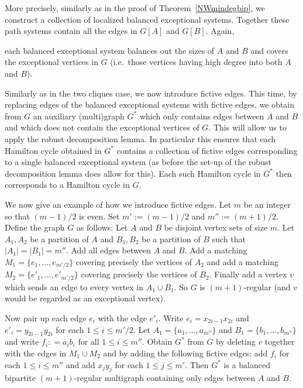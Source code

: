 \documentclass{memo-l}
\def\COMMENT#1{}
\numberwithin{section}{chapter}
\numberwithin{equation}{section}
\numberwithin{firstthm}{section}
\numberwithin{figure}{section}
\begin{document}
{More precisely, similarly as in the proof of Theorem~\ref{NWmindegbip}, we construct a collection of localized balanced exceptional systems.
Together these path systems contain all the edges in $G[A]$ and $G[B]$. 
Again,%
\COMMENT{osthus added `again'} 
each balanced exceptional system balances out the sizes of $A$ and $B$ and covers the exceptional
vertices in $G$ (i.e.~those vertices having high degree into both $A$ and $B$).

Similarly as in the two cliques case, we now introduce fictive edges. This time,
by replacing  edges of the balanced exceptional systems with fictive edges,
we obtain from $G$ an auxiliary (multi)graph $G^*$ which only contains edges between $A$ and $B$ and 
which does not contain the exceptional vertices of $G$. 
This will allow us to apply
 the robust decomposition lemma. In particular this ensures that each Hamilton cycle obtained in $G^*$ contains
a collection of fictive edges corresponding to a single balanced exceptional system (as before the set-up of
the robust decomposition lemma does allow for this). Each such Hamilton cycle in $G^*$ then corresponds
to a Hamilton cycle in $G$.

We now give an example of how we introduce fictive edges.
Let $m$ be an integer so that $(m-1)/2$ is even. Set $m':= (m-1)/2$ and $m'':= (m+1)/2$. 
Define the graph $G$ as follows:
Let $A$ and $B$ be disjoint vertex sets of size $m$. Let $A_1, A_2$ be a partition of $A$ and
$B_1,B_2$ be a partition of $B$ such that $|A_1|=|B_1|=m''$. Add all edges between $A$ and $B$. Add
a matching $M_1=\{e_1, \dots, e_{m'/2}\}$ covering precisely the
vertices of $A_2$ and add a matching $M_2=\{e'_1, \dots, e'_{m'/2}\}$ covering precisely the vertices of $B_2$. Finally add a vertex
$v$ which sends an edge to every vertex in $A_1 \cup B_1$. So $G$ is $(m+1)$-regular (and $v$ would be regarded as an exceptional vertex).


Now pair up each edge $e_i$ with the edge $e'_i$. Write $e_i=x_{2i-1} x_{2i}$ and
$e'_i=y_{2i-1} y_{2i}$ for each $1\leq i \leq m'/2$.
Let $A_1 =\{a_1, \dots , a_{m''}\}$ and $B_1=\{b_1, \dots , b_{m''}\}$ and write
$f_i: =a_ib_i$ for all $1 \leq i \leq m''$. Obtain $G^*$ from $G$ by deleting  $v$ together with the
edges in $M_1 \cup M_2$ and by adding the following fictive edges: 
add $f_i$ for each $1\leq i \leq m''$ and add $x_jy_j$ for each $1\leq j \leq m'$.
Then $G^*$ is a balanced bipartite $(m+1)$-regular multigraph containing only edges between $A$ and $B$.

}
\end{document}
